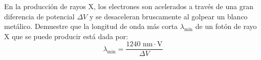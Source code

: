 \item En la producción de rayos X, los electrones son acelerados a través de una gran diferencia de potencial $\Delta V$ y se desaceleran bruscamente al golpear un blanco metálico. Demuestre que la longitud de onda más corta $\lambda_{\text{min}}$ de un fotón de rayo X que se puede producir está dada por:
$$ \lambda_{\text{min}} = \frac{1240\text{ nm}\cdot\text{V}}{\Delta V} $$